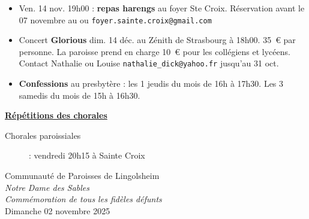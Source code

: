 \documentclass[french,11pt]{article}
\newcommand{\JournalName}[1]{%
		\begin{center}
            \Large \usefont{T1}{augie}{m}{n}
			#1%
		\end{center}
		\par \normalsize \normalfont}
\newcommand*{\footer}{..}
\newcommand{\NewsItem}[1]{%
\vspace{3pt}
\underline{\textbf{#1}}
		  }
\begin{document}
\begin{itemize}
\item Ven. 14 nov. 19h00 : \textbf{repas harengs} au foyer Ste Croix. Réservation avant le 07 novembre au  ou \texttt{foyer.sainte.croix@gmail.com}
\item
Concert \textbf{Glorious} dim. 14 déc. au Zénith de Strasbourg à 18h00. 35~€ par personne. La paroisse prend en charge 10~€ pour les collégiens et lycéens. Contact Nathalie ou Louise \texttt{nathalie\_dick@yahoo.fr} jusqu'au 31 oct.
\item
\textbf{Confessions} au presbytère : les 1\iers{} jeudis du mois de 16h à 17h30. Les 3\iemes{} samedis du mois de 15h à 16h30.
\end{itemize}

\NewsItem{Répétitions des chorales}
\begin{description}
\item[Chorales paroissiales] : vendredi 20h15 à Sainte Croix
\end{description}



\newpage

\JournalName{Communauté de Paroisses de Lingolsheim \\
\normalsize \textit{Notre Dame des Sables}
\\  \normalsize \textit{Commémoration de tous les fidèles défunts}
\\ \large Dimanche 02 novembre 2025}


\begin{minipage}[h]{1.0\linewidth}
\setlength{\parindent}{1em}

\end{minipage}
\end{document}
